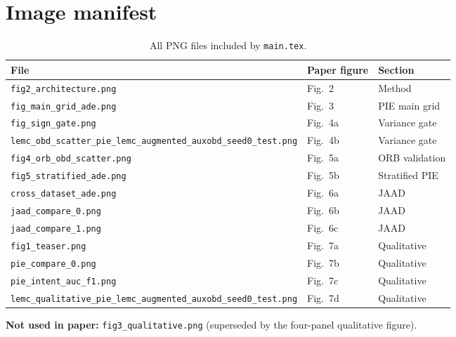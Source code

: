 \documentclass[11pt]{article}
\begin{document}
\section{Image manifest}

\begin{table}[ht]
  \centering
  \footnotesize
  \begin{tabular}{@{}lll@{}}
    \toprule
    File & Paper figure & Section \\
    \midrule
    \texttt{fig2\_architecture.png} & Fig.~2 & Method \\
    \texttt{fig\_main\_grid\_ade.png} & Fig.~3 & PIE main grid \\
    \texttt{fig\_sign\_gate.png} & Fig.~4a & Variance gate \\
    \texttt{lemc\_obd\_scatter\_pie\_lemc\_augmented\_auxobd\_seed0\_test.png} & Fig.~4b & Variance gate \\
    \texttt{fig4\_orb\_obd\_scatter.png} & Fig.~5a & ORB validation \\
    \texttt{fig5\_stratified\_ade.png} & Fig.~5b & Stratified PIE \\
    \texttt{cross\_dataset\_ade.png} & Fig.~6a & JAAD \\
    \texttt{jaad\_compare\_0.png} & Fig.~6b & JAAD \\
    \texttt{jaad\_compare\_1.png} & Fig.~6c & JAAD \\
    \texttt{fig1\_teaser.png} & Fig.~7a & Qualitative \\
    \texttt{pie\_compare\_0.png} & Fig.~7b & Qualitative \\
    \texttt{pie\_intent\_auc\_f1.png} & Fig.~7c & Qualitative \\
    \texttt{lemc\_qualitative\_pie\_lemc\_augmented\_auxobd\_seed0\_test.png} & Fig.~7d & Qualitative \\
    \bottomrule
  \end{tabular}
  \caption{All PNG files included by \texttt{main.tex}.}
\end{table}

\noindent\textbf{Not used in paper:} \texttt{fig3\_qualitative.png} (superseded by the four-panel qualitative figure).
\end{document}
